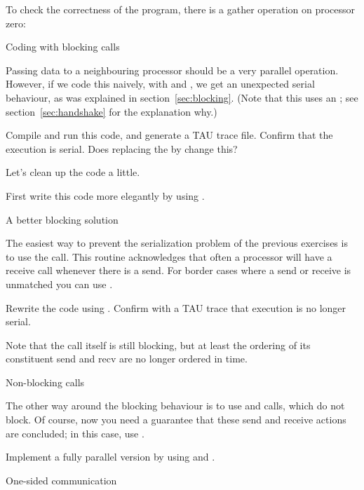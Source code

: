 To check the correctness of the program, there is a gather operation on processor zero:

 {Coding with blocking calls}

Passing data to a neighbouring processor should be a very parallel operation.
However, if we code this naively, with  and ,
we get an unexpected serial behaviour, as was explained in section~\ref{sec:blocking}.
(Note that this uses an ; see section~\ref{sec:handshake}
for the explanation why.)

\begin{exercise}
  Compile and run this code, and generate a TAU trace file. Confirm
  that the execution is serial. Does replacing the  by 
  change this?
\end{exercise}
Let's clean up the code a little.
\begin{exercise}
  First write this code more elegantly by using .
\end{exercise}

 {A better blocking solution}

The easiest way to prevent the serialization problem of the previous
exercises is to use the  call. This routine
acknowledges that often a processor will have a receive call whenever there
is a send. For border cases where a send or receive is unmatched you can
use .

\begin{exercise}
  Rewrite the code using . Confirm with a TAU trace
  that execution is no longer serial.
\end{exercise}

Note that the  call itself is still blocking, but
at least the ordering of its constituent send and recv are
no longer ordered in time.

 {Non-blocking calls}

The other way around the blocking behaviour is to use  and 
calls, which do not block. Of course, now you need a guarantee that these 
send and receive actions are concluded; in this case, use .
\begin{exercise}
  Implement a fully parallel version by using  and
  .
\end{exercise}

 {One-sided communication}

